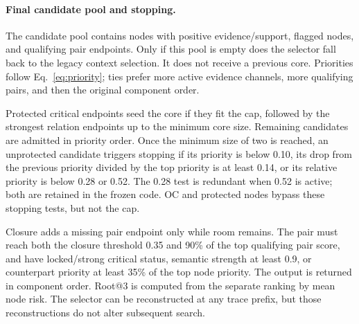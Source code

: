 \begin{revadded}
\paragraph{Final candidate pool and stopping.}
The candidate pool contains nodes with positive evidence/support, flagged nodes, and qualifying pair endpoints. Only if this pool is empty does the selector fall back to the legacy context selection. It does not receive a previous core. Priorities follow Eq.~\ref{eq:priority}; ties prefer more active evidence channels, more qualifying pairs, and then the original component order.

Protected critical endpoints seed the core if they fit the cap, followed by the strongest relation endpoints up to the minimum core size. Remaining candidates are admitted in priority order. Once the minimum size of two is reached, an unprotected candidate triggers stopping if its priority is below 0.10, its drop from the previous priority divided by the top priority is at least 0.14, or its relative priority is below 0.28 or 0.52. The 0.28 test is redundant when 0.52 is active; both are retained in the frozen code. OC and protected nodes bypass these stopping tests, but not the cap.

Closure adds a missing pair endpoint only while room remains. The pair must reach both the closure threshold 0.35 and 90\% of the top qualifying pair score, and have locked/strong critical status, semantic strength at least 0.9, or counterpart priority at least 35\% of the top node priority. The output is returned in component order. Root@3 is computed from the separate ranking by mean node risk. The selector can be reconstructed at any trace prefix, but those reconstructions do not alter subsequent search.
\end{revadded}
